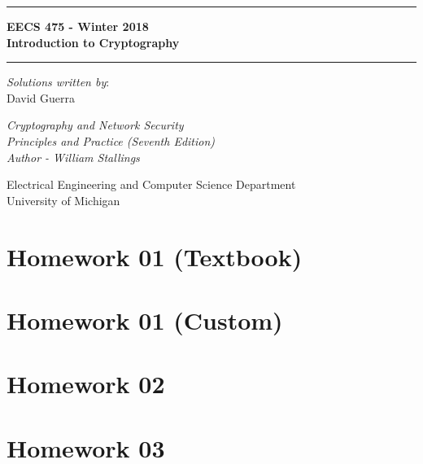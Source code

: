 \documentclass[answers]{exam}  %
\begin{document}
\begin{titlepage}
	\begin{center}
		\vspace*{4cm}

		\hrule
		\vspace{0.5cm}
		{ 
			\LARGE 
			\textbf{EECS 475 - Winter 2018}\\
			\textbf{Introduction to Cryptography}
		}
		\vspace{0.5cm}
		\hrule

		\vspace{2cm}

		{\large \textit{Solutions written by}:\\ }
		{\large David Guerra}

		\vfill

		{ \Large \textit{Cryptography and Network Security}\\ }
		{ \Large \textit{Principles and Practice (Seventh Edition)}\\ }
		{ \Large \textit{Author - William Stallings} }

		\vspace{2cm}

		\Large
		Electrical Engineering and Computer Science Department\\
		University of Michigan

	\end{center}
\end{titlepage}
\newpage

\tableofcontents
\newpage

\section{Homework 01 (Textbook)}

\newpage

\section{Homework 01 (Custom)}

\newpage

\section{Homework 02}

\newpage

\section{Homework 03}

\newpage
\end{document}
